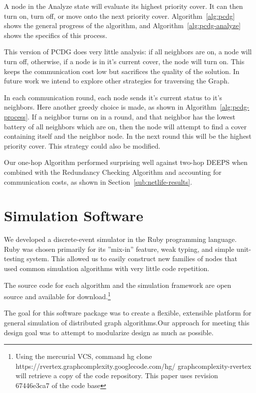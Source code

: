A node in the Analyze state will evaluate its highest priority cover. It can then turn on, turn off, or move onto the next priority cover. Algorithm~\ref{alg:pcdg} shows the general progress of the algorithm, and Algorithm~\ref{alg:pcdg-analyze} shows the specifics of this process.

This version of PCDG does very little analysis: if all neighbors are on, a node will turn off, otherwise, if a node is in it's current cover, the node will turn on. This keeps the communication cost low but sacrifices the quality of the solution. In future work we intend to explore other strategies for traversing the Graph.

In each communication round, each node sends it's current status to it's neighbors. Here another greedy choice is made, as shown in Algorithm~\ref{alg:pcdg-process}. If a neighbor turns on in a round, and that neighbor has the lowest battery of all neighbors which are on, then the node will attempt to find a cover containing itself and the neighbor node. In the next round this will be the highest priority cover. This strategy could also be modified. 

Our one-hop Algorithm performed surprising well against two-hop DEEPS when combined with the Redundancy Checking Algorithm and accounting for communication costs, as shown in Section~\ref{sub:netlife-results}.




\section{Simulation Software}
\label{sec:simulator}

We developed a discrete-event simulator in the Ruby programming language. Ruby was chosen primarily for its ''mix-in'' feature, weak typing, and simple unit-testing system. This allowed us to easily construct new families of nodes that used common simulation algorithms with very little code repetition.

The source code for each algorithm and the simulation framework are open source and available for download.\footnote{Using the mercurial VCS, command hg clone https://rvertex.graphcomplexity.googlecode.com/hg/ graphcomplexity-rvertex will retrieve a copy of the code repository. This paper uses revision 67446e3ca7 of the code base} 

The goal for this software package was to create a flexible, extensible platform for general simulation of distributed graph algorithms.Our approach for meeting this design goal was to attempt to modularize design as much as possible.

